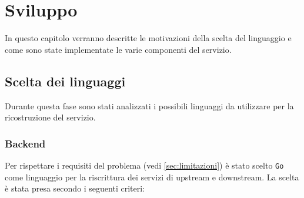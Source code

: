 \chapter{Sviluppo}
\label{chap:development}
In questo capitolo verranno descritte le motivazioni della scelta del linguaggio e come sono state implementate le varie componenti del servizio.
\section{Scelta dei linguaggi}
Durante questa fase sono stati analizzati i possibili linguaggi da utilizzare per la ricostruzione del servizio.

\subsection{Backend}
Per rispettare i requisiti del problema (vedi \cref{sec:limitazioni}) è stato scelto \texttt{Go} come linguaggio per la riscrittura dei servizi di upstream e downstream.
La scelta è stata presa secondo i seguenti criteri:

